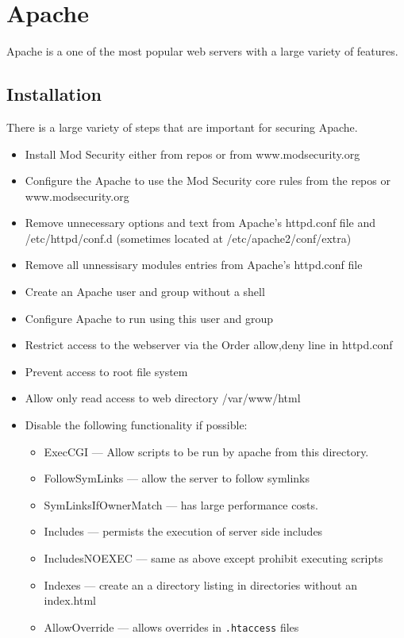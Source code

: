 \section{Apache}

Apache is a one of the most popular web servers with a large variety of features.

\subsection{Installation}
There is a large variety of steps that are important for securing Apache.
\begin{itemize}
	\item Install Mod Security either from repos or from www.modsecurity.org
	\item Configure the Apache to use the Mod Security core rules from the repos or www.modsecurity.org
	\item Remove unnecessary options and text from Apache's httpd.conf file and /etc/httpd/conf.d (sometimes located at /etc/apache2/conf/extra)
	\item Remove all unnessisary modules entries from Apache's httpd.conf file
	\item Create an Apache user and group without a shell
	\item Configure Apache to run using this user and group
	\item Restrict access to the webserver via the Order allow,deny line in httpd.conf
	\item Prevent access to root file system
	\item Allow only read access to web directory /var/www/html
	\item Disable the following functionality if possible:
		\begin{itemize}
			\item ExecCGI --- Allow scripts to be run by apache from this directory.
			\item FollowSymLinks --- allow the server to follow symlinks
			\item SymLinksIfOwnerMatch --- has large performance costs.
			\item Includes --- permists the execution of server side includes
			\item IncludesNOEXEC --- same as above except prohibit executing scripts
			\item Indexes --- create an a directory listing in directories without an index.html
			\item AllowOverride --- allows overrides in \lstinline|.htaccess| files

\end{itemize}
\end{itemize}
